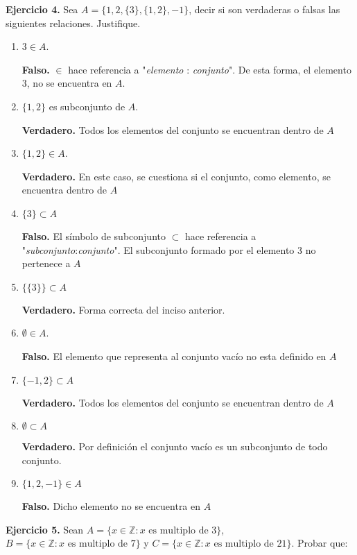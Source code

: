 \textbf{Ejercicio 4.} Sea $A = \{1, 2, \{3\}, \{1, 2\}, -1\}$, decir si son verdaderas o falsas las siguientes relaciones. Justifique.

\begin{enumerate}
	\item $3 \in A$. 
	
	\textbf{Falso.} $\in$ hace referencia a "\textit{elemento} : \textit{conjunto}". De esta forma, el elemento 3, no se encuentra en $A$.
	
	\item $\{1, 2\}$ es subconjunto de $A$.
	
	\textbf{Verdadero.} Todos los elementos del conjunto se encuentran dentro de $A$
	
	\item $\{1, 2\} \in A$.
	
	\textbf{Verdadero.} En este caso, se cuestiona si el conjunto, como elemento, se encuentra dentro de $A$
	
	\item $\{3\} \subset A$ 
	
	\textbf{Falso.} El s\'imbolo de subconjunto $\subset$ hace referencia a "\textit{subconjunto}:\textit{conjunto}". El subconjunto formado por el elemento 3 no pertenece a $A$
	
	\item $\{\{3\}\} \subset A$
	
	\textbf{Verdadero.} Forma correcta del inciso anterior.
	
	\item $\emptyset \in A$.
	
	\textbf{Falso.} El elemento que representa al conjunto vac\'io no esta definido en $A$
	
	\item $\{-1, 2\} \subset A$
	
	\textbf{Verdadero.} Todos los elementos del conjunto se encuentran dentro de $A$
	
	\item $\emptyset \subset A$
	
	\textbf{Verdadero.} Por definici\'on el conjunto vac\'io es un subconjunto de todo conjunto.
	
	\item $\{1, 2, -1\} \in A$
	
	\textbf{Falso.} Dicho elemento no se encuentra en $A$
\end{enumerate}

\textbf{Ejercicio 5.} Sean $A = \{x \in \mathbb{Z}: x \text{ es multiplo de } 3\}$, $B = \{x \in \mathbb{Z}: x \text{ es multiplo de } 7\}$ y $C = \{x \in \mathbb{Z}: x \text{ es multiplo de } 21\}$. Probar que:

